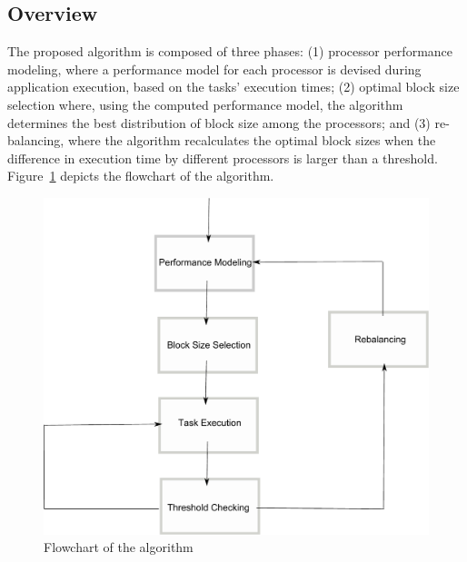 \documentclass[journal]{IEEEtran}
\begin{document}
\subsection{Overview}
The proposed algorithm is composed of three phases: (1) processor performance
modeling, where a performance model for each processor is devised during
application execution, based on the tasks' execution times; (2) optimal block
size selection where, using the computed performance model, the algorithm
determines the best distribution of block size among the processors; and (3)
re-balancing, where the algorithm recalculates the optimal block sizes when the
difference in execution time by different processors is larger than a
threshold. Figure~\ref{fig: fluxo1} depicts the flowchart of the algorithm.

%
\begin{figure}[!t]
	\centering
			\includegraphics[width=.8\linewidth]{Fluxo.pdf} 				
	\caption{Flowchart of the algorithm}
	\label{fig: fluxo1}
\end{figure}
\end{document}
